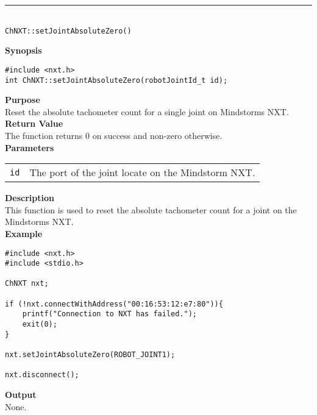 \noindent
\vspace{5pt}
\rule{4.5in}{0.015in}\\
\noindent
{\LARGE \texttt{ChNXT::setJointAbsoluteZero()} }\\


\noindent
{\bf Synopsis}
\vspace{-8pt}
\begin{verbatim}
#include <nxt.h>
int ChNXT::setJointAbsoluteZero(robotJointId_t id);
\end{verbatim}

\noindent
{\bf Purpose}\\
Reset the absolute tachometer count for a single joint on Mindstorms NXT.\\

\noindent
{\bf Return Value}\\
The function returns 0 on success and non-zero otherwise.\\

\noindent
{\bf Parameters}\\
\vspace{-0.1in}
\begin{description}
\item
\begin{tabular}{p{20mm}p{135mm}}
\texttt{id} &The port of the joint locate on the Mindstorm NXT.\\
\end{tabular}
\end{description}

\noindent
{\bf Description}\\
This function is used to reset the absolute tachometer count for a joint on the Mindstorms NXT.\\

\noindent
{\bf Example}
\begin{verbatim}
#include <nxt.h> 
#include <stdio.h>

ChNXT nxt;

if (!nxt.connectWithAddress("00:16:53:12:e7:80")){
    printf("Connection to NXT has failed.");
    exit(0);
}
    
nxt.setJointAbsoluteZero(ROBOT_JOINT1);

nxt.disconnect();
\end{verbatim}

\noindent
{\bf Output}\\
None.\\
\\
